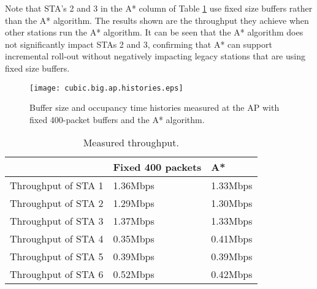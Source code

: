 \documentclass[10pt,twocolumn, journal]{IEEEtran}
\begin{document}
Note that STA's 2 and 3 in the A* column of Table \ref{tab_cubic} use fixed size buffers rather than the A* algorithm.   The results shown are the throughput they achieve when other stations run the A* algorithm. It can be seen that the A* algorithm does not significantly impact STAs 2 and 3, confirming that A* can support incremental roll-out without negatively impacting legacy stations that are using fixed size buffers.



\begin{figure}[tb]
    \centering
    \texttt{[image: cubic.big.ap.histories.eps]}
     \caption{Buffer size and occupancy time histories measured at the AP with fixed 400-packet buffers and the A* algorithm.}
    \label{fig_cubic}
\end{figure}

\begin{table}[tb]
    \begin{center}
        {\footnotesize
            \begin{tabular}{|l|l|l|}
            \hline
                                    & \textbf{Fixed 400 packets} & \textbf{A*}  \\
            \hline
            Throughput of STA 1     & 1.36Mbps                  & 1.33Mbps  \\
            \hline
            Throughput of STA 2     & 1.29Mbps                  & 1.30Mbps  \\
            \hline
            Throughput of STA 3     & 1.37Mbps                  & 1.33Mbps  \\
            \hline
            Throughput of STA 4     & 0.35Mbps                  & 0.41Mbps  \\
            \hline
            Throughput of STA 5     & 0.39Mbps                  & 0.39Mbps  \\
            \hline
            Throughput of STA 6     & 0.52Mbps                  & 0.42Mbps  \\
            \hline
            \end{tabular}
        }
    \end{center}
    \caption{Measured throughput.} \label{tab_cubic}
\end{table}
\end{document}
